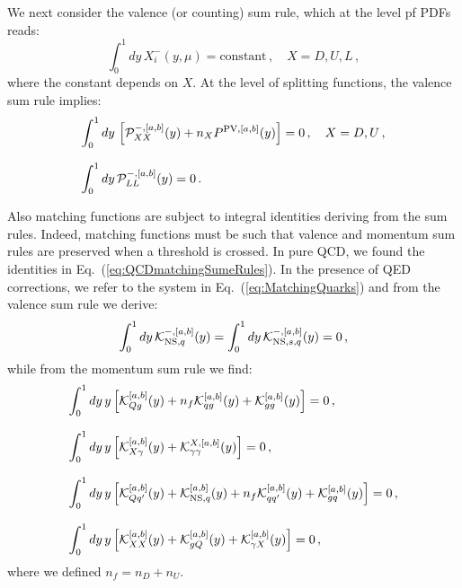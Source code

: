 \documentclass[10pt,a4paper]{article}
\begin{document}
We next consider the valence (or counting) sum rule, which at the
level pf PDFs reads:
\begin{equation}
\int_0^1dy\,X_i^-(y,\mu)=\mbox{constant}\,,\quad X=D,U,L\,,
\end{equation}
where the constant depends on $X$. At the level of splitting
functions, the valence sum rule implies:
\begin{equation}
\begin{array}{l}
\displaystyle \int_0^1dy\,\left[\mathcal{P}_{XX}^{-,[a,b]}(y)+n_X P^{{\rm
  PV},[a,b]}(y)\right]=0\,,\quad X=D,U\,,\\
\\
\displaystyle \int_0^1dy\,\mathcal{P}_{LL}^{-,[a,b]}(y)=0\,.
\end{array}
\end{equation}

Also matching functions are subject to integral identities deriving
from the sum rules. Indeed, matching functions must be such that
valence and momentum sum rules are preserved when a threshold is
crossed. In pure QCD, we found the identities in
Eq.~(\ref{eq:QCDmatchingSumeRules}). In the presence of QED
corrections, we refer to the system in Eq.~(\ref{eq:MatchingQuarks})
and from the valence sum rule we derive:
\begin{equation}
\int_0^1dy\, \mathcal{K}_{{\rm NS},q}^{-,[a,b]}(y)=\int_0^1dy\, \mathcal{K}_{{\rm NS},s,q}^{-,[a,b]}(y)=0\,,
\end{equation}
while from the momentum sum rule we find:
\begin{equation}
\begin{array}{l}
\displaystyle \int_0^1dy\,y\left[\mathcal{K}_{Qg}^{[a,b]}(y)+n_f\mathcal{K}_{qg}^{[a,b]}(y)+\mathcal{K}_{gg}^{[a,b]}(y)\right]=0\,,\\
\\
\displaystyle \int_0^1dy\,y\left[\mathcal{K}_{X\gamma}^{[a,b]}(y)+\mathcal{K}_{\gamma\gamma}^{X,[a,b]}(y)\right]=0\,,\\
\\
\displaystyle \int_0^1dy\,y\left[\mathcal{K}_{Qq'}^{[a,b]}(y)+\mathcal{K}_{{\rm NS},q}^{[a,b]}(y)+n_f\mathcal{K}_{qq'}^{[a,b]}(y)+\mathcal{K}_{gq}^{[a,b]}(y)\right]=0\,,\\
\\
\displaystyle \int_0^1dy\,y\left[\mathcal{K}_{XX}^{[a,b]}(y)+\mathcal{K}_{gQ}^{[a,b]}(y)+\mathcal{K}_{\gamma X}^{[a,b]}(y)\right]=0\,,
\end{array}
\end{equation}
where we defined $n_f=n_D+n_U$.


\newpage


\end{document}
